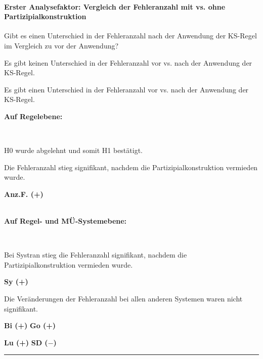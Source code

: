 \paragraph*{Erster Analysefaktor: Vergleich der Fehleranzahl mit vs. ohne Partizipialkonstruktion}
\begin{description}[font=\normalfont\bfseries]
\item [Fragestellung:] Gibt es einen Unterschied in der Fehleranzahl nach der Anwendung der KS-Regel im Vergleich zu vor der Anwendung?
\item [H0 --] Es gibt keinen Unterschied in der Fehleranzahl vor vs. nach der Anwendung der KS-Regel.
\item [H1 --] Es gibt einen Unterschied in der Fehleranzahl vor vs. nach der Anwendung der KS-Regel.
\newpage
\item [Resultat]
\end{description}
\noindent
\parbox[t]{.75\textwidth}{\textbf{Auf Regelebene:}}\\
\parbox[t]{.75\textwidth}{
H0 wurde abgelehnt und somit H1 bestätigt.

Die Fehleranzahl stieg signifikant, nachdem die Partizipialkonstruktion vermieden wurde.
}
\parbox[t]{.04\textwidth}{}
\colorbox{smGreen}{\parbox[t]{.2\textwidth}{
\textbf{Anz.F. (+)}\\
\\
}}

\noindent
\parbox[t]{.75\textwidth}{\textbf{Auf Regel- und MÜ-Systemebene:}}\\
\parbox[t]{.75\textwidth}{
Bei Systran stieg die Fehleranzahl signifikant, nachdem die Partizipialkonstruktion vermieden wurde.
}
\parbox[t]{.04\textwidth}{}
\colorbox{smGreen}{\parbox[t]{.2\textwidth}{
\textbf{Sy (+)}\\
}}

\medskip
\noindent
\parbox[t]{.75\textwidth}{
Die Veränderungen der Fehleranzahl bei allen anderen Systemen waren nicht signifikant.
}
\parbox[t]{.04\textwidth}{}
\parbox[t]{.2\textwidth}{
{ \textbf{Bi (+)}}{ \textbf{Go (+)}}

{ \textbf{Lu (+)}} \textbf{SD ($-$)}
}

\hrule
